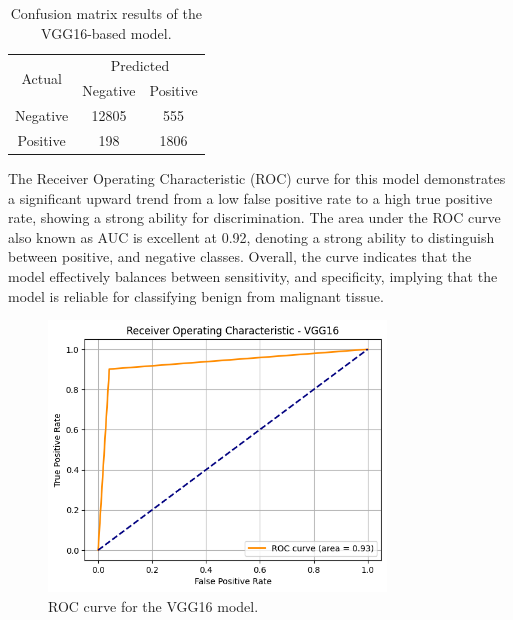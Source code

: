 \documentclass[../main]{subfiles}
\begin{document}
\begin{table}[h]
    \centering
    \begin{tabular}{|c|c|c|}
        \hline
        \multirow{2}{*}{Actual} & \multicolumn{2}{c|}{Predicted} \\ \cline{2-3}
                                & Negative         & Positive         \\ \hline
        Negative                & 12805            & 555              \\ \hline
        Positive                & 198              & 1806              \\ \hline
    \end{tabular}
    \caption{Confusion matrix results of the VGG16-based model.}
    \label{tab:confusion-matrix-vgg16}
\end{table}

\noindent The Receiver Operating Characteristic (ROC) curve for this model demonstrates a significant upward trend from a low false positive rate to a high true positive rate, showing a strong ability for discrimination. The area under the ROC curve also known as AUC is excellent at 0.92, denoting a strong ability to distinguish between positive, and negative classes. Overall, the curve indicates that the model effectively balances between sensitivity, and specificity, implying that the model is reliable for classifying benign from malignant tissue.

\begin{figure}[h]
	\centering
	\includegraphics[width=0.8\textwidth]{assets/roc_vgg16.png}
	\caption{ROC curve for the VGG16 model.}
    \label{fig:roc-vgg16}
\end{figure}
\end{document}
